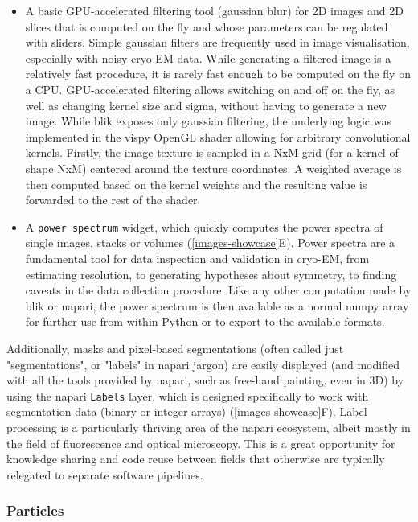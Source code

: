 \begin{itemize} 
    \item A basic GPU-accelerated filtering tool (gaussian blur) for 2D images and 2D slices that is computed on the fly and whose parameters can be regulated with sliders. Simple gaussian filters are frequently used in image visualisation, especially with noisy cryo-EM data. While generating a filtered image is a relatively fast procedure, it is rarely fast enough to be computed on the fly on a CPU. GPU-accelerated filtering allows switching on and off on the fly, as well as changing kernel size and sigma, without having to generate a new image. While blik exposes only gaussian filtering, the underlying logic was implemented in the vispy OpenGL shader allowing for arbitrary convolutional kernels. Firstly, the image texture is sampled in a NxM grid (for a kernel of shape NxM) centered around the texture coordinates. A weighted average is then computed based on the kernel weights and the resulting value is forwarded to the rest of the shader. 
    \item A \texttt{power\ spectrum} widget, which quickly computes the power spectra of single images, stacks or volumes (\autoref{images-showcase}E). Power spectra are a fundamental tool for data inspection and validation in cryo-EM, from estimating resolution, to generating hypotheses about symmetry, to finding caveats in the data collection procedure. Like any other computation made by blik or napari, the power spectrum is then available as a normal numpy array for further use from within Python or to export to the available formats.
\end{itemize}

Additionally, masks and pixel-based segmentations (often called just "segmentations", or "labels" in napari jargon) are easily displayed (and modified with all the tools provided by napari, such as free-hand painting, even in 3D) by using the napari \texttt{Labels} layer, which is designed specifically to work with segmentation data (binary or integer arrays) (\autoref{images-showcase}F). Label processing is a particularly thriving area of the napari ecosystem, albeit mostly in the field of fluorescence and optical microscopy. This is a great opportunity for knowledge sharing and code reuse between fields that otherwise are typically relegated to separate software pipelines.

\subsubsection{Particles}\label{particles}

